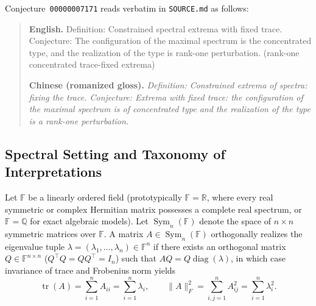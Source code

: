 \documentclass[11pt]{article}
\theoremstyle{definition}
\theoremstyle{remark}
\newcommand{\tr}{\operatorname{tr}}
\newcommand{\diag}{\operatorname{diag}}
\newcommand{\Sym}{\operatorname{Sym}}
\begin{document}
Conjecture~\texttt{00000007171} reads verbatim in \texttt{SOURCE.md} as follows:
\begin{quote}
\textbf{English.} Definition: Constrained spectral extrema with fixed trace. Conjecture: The configuration of the maximal spectrum is the concentrated type, and the realization of the type is rank-one perturbation. (rank-one concentrated trace-fixed extrema)

\medskip
\textbf{Chinese (romanized gloss).} \emph{Definition: Constrained extrema of spectra: fixing the trace. Conjecture: Extrema with fixed trace: the configuration of the maximal spectrum is of concentrated type and the realization of the type is a rank-one perturbation.}
\end{quote}

\subsection{Spectral Setting and Taxonomy of Interpretations}

Let $\mathbb{F}$ be a linearly ordered field (prototypically $\mathbb{F} = \mathbb{R}$, where every real symmetric or complex Hermitian matrix possesses a complete real spectrum, or $\mathbb{F} = \mathbb{Q}$ for exact algebraic models). Let $\Sym_n(\mathbb{F})$ denote the space of $n \times n$ symmetric matrices over $\mathbb{F}$. A matrix $A \in \Sym_n(\mathbb{F})$ orthogonally realizes the eigenvalue tuple $\lambda = (\lambda_1, \dots, \lambda_n) \in \mathbb{F}^n$ if there exists an orthogonal matrix $Q \in \mathbb{F}^{n \times n}$ ($Q^\top Q = Q Q^\top = I_n$) such that $A Q = Q \diag(\lambda)$, in which case invariance of trace and Frobenius norm yields
\[
  \tr(A) = \sum_{i=1}^n A_{ii} = \sum_{i=1}^n \lambda_i, \qquad
  \|A\|_F^2 = \sum_{i,j=1}^n A_{ij}^2 = \sum_{i=1}^n \lambda_i^2.
\]
\end{document}
